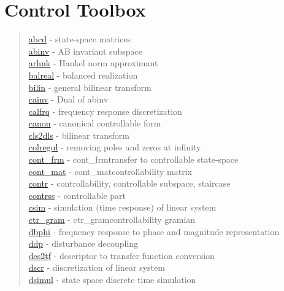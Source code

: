 \chapter*{Control Toolbox}

\begin{quote}
\noindent
\hyperlink{abcd}{abcd} - {state-space matrices} \\  
\hyperlink{abinv}{abinv} - {AB invariant subspace} \\  
\hyperlink{arhnk}{arhnk} - {Hankel norm approximant} \\  
\hyperlink{balreal}{balreal} - {balanced realization} \\  
\hyperlink{bilin}{bilin} - {general bilinear transform} \\  
\hyperlink{cainv}{cainv} - { Dual of abinv} \\  
\hyperlink{calfrq}{calfrq} - {frequency response discretization} \\  
\hyperlink{canon}{canon} - {canonical controllable form} \\  
\hyperlink{cls2dls}{cls2dls} - {bilinear transform} \\  
\hyperlink{colregul}{colregul} - {removing poles and zeros at infinity} \\  
\hyperlink{cont_frm}{cont\_frm} - {cont_frm}{transfer to controllable state-space} \\  
\hyperlink{cont_mat}{cont\_mat} - {cont_mat}{controllability matrix} \\  
\hyperlink{contr}{contr} - {controllability, controllable subspace, staircase} \\ %
\hyperlink{contrss}{contrss} - {controllable part} \\  
\hyperlink{csim}{csim} - {simulation (time response) of linear system} \\  
\hyperlink{ctr_gram}{ctr\_gram} - {ctr_gram}{controllability gramian} \\  
\hyperlink{dbphi}{dbphi} - {frequency response to phase and magnitude representation} \\  
\hyperlink{ddp}{ddp} - {disturbance decoupling} \\  
\hyperlink{des2tf}{des2tf} - {descriptor to transfer function conversion} \\  
\hyperlink{dscr}{dscr} - { discretization of linear system} \\  
\hyperlink{dsimul}{dsimul} - { state space discrete time simulation} \\  

\end{quote}

